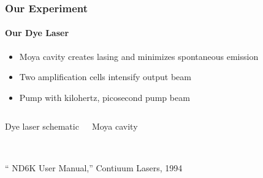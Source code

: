 \documentclass{beamer}
\begin{document}
\begin{frame}
  \frametitle{Our Experiment}
  \framesubtitle{Our Dye Laser}
  \begin{itemize}
	\item Moya cavity creates lasing and minimizes spontaneous emission\\
	\item Two amplification cells intensify output beam\\
	\item Pump with kilohertz, picosecond pump beam
  \end{itemize}
  \begin{columns}
\center	Dye laser schematic
  \center Moya cavity
  \end{columns}
 \\ {\tiny `` ND6K User Manual,'' Contiuum Lasers, 1994}
\end{frame}
\end{document}
